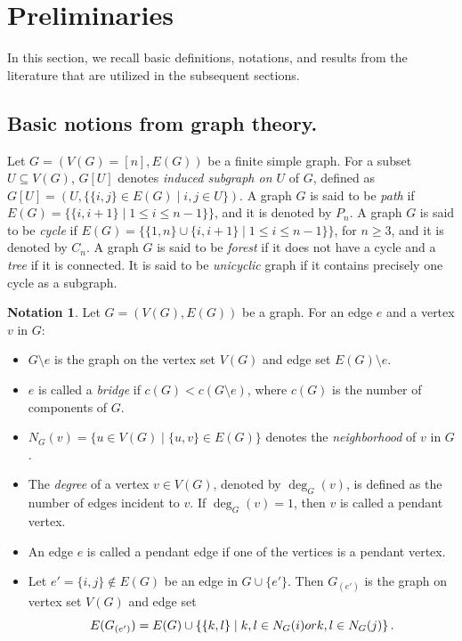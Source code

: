 \documentclass[11pt,a4paper,reqno]{amsart}
\theoremstyle{definition}
\newtheorem{notation}[theorem]{Notation}
\begin{document}
\section{Preliminaries}

In this section, we recall basic definitions, notations, and results from the literature that are utilized in the subsequent sections.


\subsection{Basic notions from graph theory.} Let $G=(V(G)=[n],E(G))$ be a finite simple graph. For a subset $U \subseteq V(G)$, $G[U]$ denotes \textit{induced subgraph on $U$} of $G$, defined as $G[U]=(U,\{\{i,j\}\in E(G) \mid i,j \in U\})$. A graph $G$ is said to be \textit{path} if $E(G)=\{\{i,i+1\} \mid 1 \leq i \leq n-1\}\}$, and it is denoted by $P_n$. A graph $G$ is said to be  \textit{cycle} if $E(G)=\{ \{1,n\} \cup \{i,i+1\} \mid 1 \leq i \leq n-1\}\}$, for $n \geq 3$, and it is denoted by $C_n$. A graph $G$ is said to be \textit{forest} if it does not have a cycle and a \textit{tree} if it is connected.
It is said to be \textit{unicyclic} graph if it contains precisely one cycle as a subgraph.


\begin{notation} \label{not.g}
Let $G=(V(G),E(G))$ be a graph. For an edge $e$ and a vertex $v$ in $G$:
\begin{itemize}
    \item $G\setminus e$ is the graph on the vertex set $V(G)$ and edge set $E(G)\setminus {e}$.
    \item $e$ is called a \emph{bridge} if $c(G) < c(G \setminus e)$, where $c(G)$ is the number of components of $G$.
    \item $N_{G}(v) = \{u \in V(G) \mid \{u,v\} \in E(G)\}$ denotes the \emph{neighborhood} of $v$ in $G$.
    \item The \textit{degree} of a vertex $v \in V(G)$, denoted by $\deg_{G}(v)$, is defined as the number of edges incident to $v$. If $\deg_{G}(v)=1$, then $v$ is called a pendant vertex.
    \item An edge $e$ is called a pendant edge if one of the vertices is a pendant vertex.
    \item \cite[Definition 3.1]{MS} Let $e' =\{i,j\} \notin E(G)$ be an edge in $G \cup \{e'\}$. Then $G_{(e')}$ is the graph on vertex set $V(G)$ and edge set $$E(G_{(e')}) = E(G) \cup \left\{ \{k,l\} \mid k,l \in N_{G}(i) \textnormal{ or } k,l \in N_{G}(j) \right\}.$$
\end{itemize}
   
\end{notation}
\end{document}
